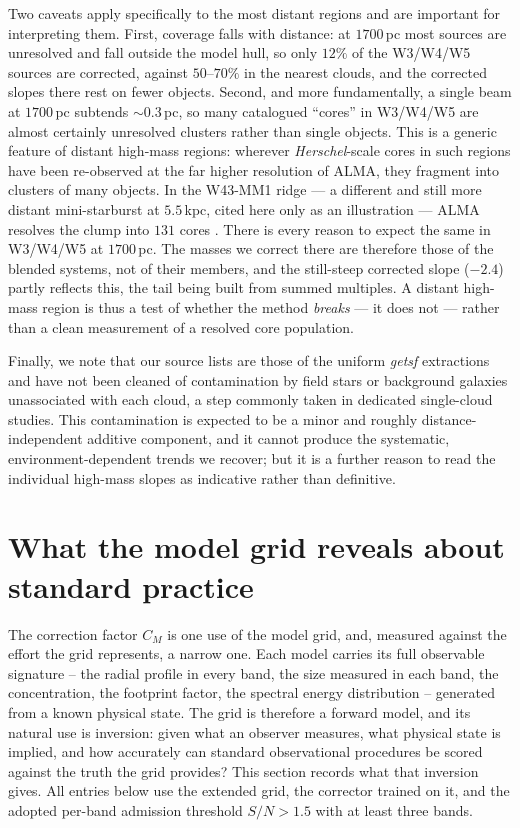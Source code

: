 \documentclass[11pt,a4paper]{article}
\begin{document}
Two caveats apply specifically to the most distant regions and are important
for interpreting them. First, coverage falls with distance: at $1700$\,pc most
sources are unresolved and fall outside the model hull, so only $12\%$ of the
W3/W4/W5 sources are corrected, against $50$--$70\%$ in the nearest clouds, and
the corrected slopes there rest on fewer objects. Second, and more
fundamentally, a single beam at $1700$\,pc subtends $\sim$$0.3$\,pc, so many
catalogued ``cores'' in W3/W4/W5 are almost certainly unresolved clusters
rather than single objects. This is a generic feature of distant high-mass
regions: wherever \emph{Herschel}-scale cores in such regions have been
re-observed at the far higher resolution of ALMA, they fragment into clusters
of many objects. In the W43-MM1 ridge --- a different and still more distant
mini-starburst at $5.5$\,kpc, cited here only as an illustration --- ALMA
resolves the clump into $131$ cores \citep{Motte+2018}. There is every reason
to expect the same in W3/W4/W5 at $1700$\,pc. The masses we correct there are
therefore those of the blended systems, not of their members, and the
still-steep corrected slope ($-2.4$) partly reflects this, the tail being built
from summed multiples. A distant high-mass region is thus a test of whether the
method \emph{breaks} --- it does not --- rather than a clean measurement of a
resolved core population.

Finally, we note that our source lists are those of the uniform \emph{getsf}
extractions and have not been cleaned of contamination by field stars or
background galaxies unassociated with each cloud, a step commonly taken in
dedicated single-cloud studies. This contamination is expected to be a minor
and roughly distance-independent additive component, and it cannot produce the
systematic, environment-dependent trends we recover; but it is a further reason
to read the individual high-mass slopes as indicative rather than definitive.

\section{What the model grid reveals about standard practice}
\label{sec:practice}

The correction factor $C_M$ is one use of the model grid, and, measured against
the effort the grid represents, a narrow one. Each model carries its full
observable signature -- the radial profile in every band, the size measured in
each band, the concentration, the footprint factor, the spectral energy
distribution -- generated from a known physical state. The grid is therefore a
forward model, and its natural use is inversion: given what an observer
measures, what physical state is implied, and how accurately can standard
observational procedures be scored against the truth the grid provides? This
section records what that inversion gives. All entries below use the extended
grid, the corrector trained on it, and the adopted per-band admission threshold
$S/N > 1.5$ with at least three bands.
\end{document}
